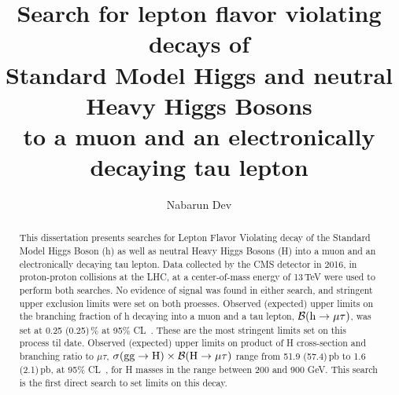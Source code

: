 \documentclass[final,numrefs,sort&compress]{nddiss2e}
\begin{document}
\newlength\cmsTabSkip
\setlength\cmsTabSkip{2ex}


\frontmatter %

\title{Search for lepton flavor violating decays of \protect\\ Standard Model Higgs and neutral Heavy Higgs Bosons \protect\\to a muon and an electronically decaying tau lepton}
\author{Nabarun Dev}

\maketitle
%
%

{} %
\makecopyright

\begin{abstract}
This dissertation presents searches for Lepton Flavor Violating decay of the Standard Model Higgs Boson (h) as well as neutral Heavy Higgs Bosons (H) into a muon and an electronically decaying tau lepton. Data collected by the CMS detector in 2016, in proton-proton collisions at the LHC, at a center-of-mass energy of 13\,TeV were used to perform both searches. No evidence of signal was found in either search, and stringent upper exclusion limits were set on both proesses. Observed (expected) upper limits on the branching fraction of h decaying into a muon and a tau lepton, $\mathcal{B}(\text{h} \to \mu \tau)$, was set at 0.25 (0.25)\,\% at 95\% CL~\cite{HIG-17-001}. These are the most stringent limits set on this process til date. Observed (expected) upper limits on product of H cross-section and branching ratio to $\mu\tau$, $\sigma(\textrm{gg}\rightarrow \text{H})\times\mathcal{B}(\text{H} \to \mu \tau)$ range from 51.9 (57.4)\,pb to 1.6 (2.1)\,pb, at 95\% CL~\cite{HIG-18-017}, for H masses in the range between 200 and 900 GeV. This search is the first direct search to set limits on this decay.
  
\end{abstract}
\end{document}
